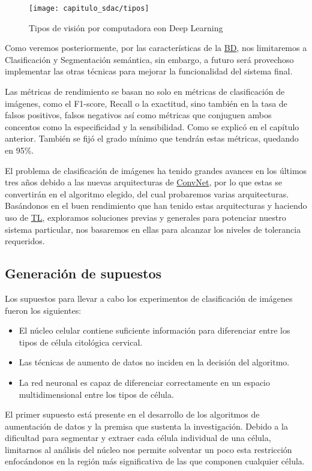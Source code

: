 \begin{figure}[H]
  \centering
  \texttt{[image: capitulo\_sdac/tipos]}
  \caption{Tipos de visión por computadora eon Deep Learning}\label{fig:tipos}
\end{figure}


Como veremos posteriormente, por las características de la \hyperlink{abbr}{BD},
nos limitaremos a Clasificación y Segmentación semántica, sin embargo, a futuro
será provechoso implementar las otras técnicas para mejorar la funcionalidad del
sistema final.

Las métricas de rendimiento se basan no solo en métricas de clasificación de
imágenes, como el F1-score, Recall o la exactitud, sino también en la tasa de
falsos positivos, falsos negativos así como métricas que conjuguen ambos
concentos como la especificidad y la sensibilidad. Como se explicó en el
capítulo anterior. También se fijó el grado mínimo que tendrán estas métricas,
quedando en 95\%.

El problema de clasificación de imágenes ha tenido grandes avances en los
últimos tres años debido a las nuevas arquitecturas de
\hyperlink{abbr}{ConvNet}, por lo que estas se convertirán en el algoritmo
elegido, del cual probaremos varias arquitecturas. Basándonos en el buen
rendimiento que han tenido estas arquitecturas y haciendo uso de
\hyperlink{abbr}{TL}, exploramos soluciones previas y generales para potenciar
nuestro sistema particular, nos basaremos en ellas para alcanzar los niveles de
tolerancia requeridos.

\subsection{Generación de supuestos}

Los supuestos para llevar a cabo los experimentos de clasificación de imágenes
fueron los siguientes:

\begin{itemize}
  \item El núcleo celular contiene suficiente información para diferenciar entre
  los tipos de célula citológica cervical.
  \item Las técnicas de aumento de datos no inciden en la decisión del
  algoritmo.
  \item La red neuronal es capaz de diferenciar correctamente en un espacio
  multidimensional entre los tipos de célula.
\end{itemize}

El primer supuesto está presente en el desarrollo de los algoritmos de
aumentación de datos y la premisa que sustenta la investigación. Debido a la
dificultad para segmentar y extraer cada célula individual de una célula,
limitarnos al análisis del núcleo nos permite solventar un poco esta restricción
enfocándonos en la región más significativa de las que componen cualquier
célula. 

